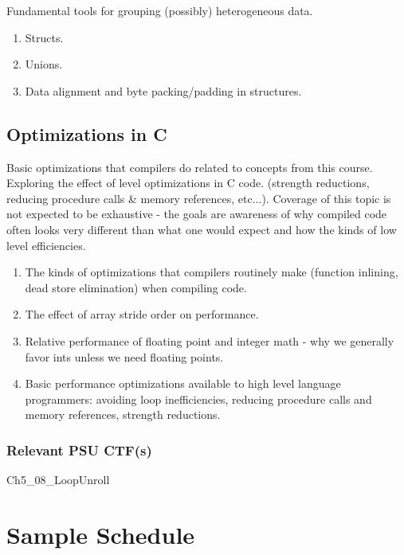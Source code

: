 \documentclass[12pt,letterpaper]{article}
\begin{document}
	Fundamental tools for grouping (possibly) heterogeneous data.

	\begin{enumerate}
		\item Structs.
		\item Unions.
		\item Data alignment and byte packing/padding in structures. 
	\end{enumerate}


	\subsection{Optimizations in C}

	Basic optimizations that compilers do related to concepts from this course. Exploring the effect of level optimizations in C code. (strength reductions, reducing procedure calls \& memory references, etc...). Coverage of this topic is not expected to be exhaustive - the goals are awareness of why compiled code often looks very different than what one would expect and how the kinds of low level efficiencies.

	\begin{enumerate}
		\item The kinds of optimizations that compilers routinely make (function inlining, dead store elimination) when compiling code.
		\item The effect of array stride order on performance.
		\item Relative performance of floating point and integer math - why we generally favor ints unless we need floating points.
		\item Basic performance optimizations available to high level language programmers: avoiding loop inefficiencies, reducing procedure calls and memory references, strength reductions.
	\end{enumerate}

	\subsubsection*{Relevant PSU CTF(s)}

	Ch5\_08\_LoopUnroll

	\clearpage
	\section{Sample Schedule}
\end{document}
